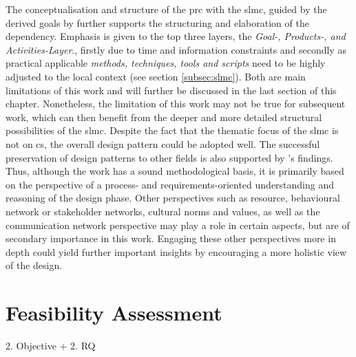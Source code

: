 The conceptualisation and structure of the \acrshort{prc} with the \acrlong{slmc}, guided by the derived goals by \autocite{minkmanCitizenScienceWater2015} further supports the structuring and elaboration of the dependency. Emphasis is given to the top three layers, the \textit{Goal-, Products-, and Activities-Layer}., firstly due to time and information constraints and secondly as practical applicable\textit{ methods, techniques, tools and scripts} need to be highly adjusted to the local context (see section \ref{subsec:slmc}). Both are main limitations of this work and will further be discussed in the last section of this chapter. Nonetheless, the limitation of this work may not be true for subsequent work, which can then benefit from the deeper and more detailed structural possibilities of the \acrshort{slmc}. Despite the fact that the thematic focus of the \acrshort{slmc} is not on \acrshort{cs}, the overall design pattern could be adopted well. The successful preservation of design patterns to other fields is also supported by \autocite{diggelenGroundedDesignDesign2009}'s findings. Thus, although the work has a sound methodological basis, it is primarily based on the perspective of a process- and requirements-oriented understanding and reasoning of the design phase. Other perspectives such as resource, behavioural network or stakeholder networks, cultural norms and values, as well as the communication network perspective may play a role in certain aspects, but are of secondary importance in this work. Engaging these other perspectives more in depth could yield further important insights by encouraging a more holistic view of the design.



\section{Feasibility Assessment}
2. Objective + 2. RQ

